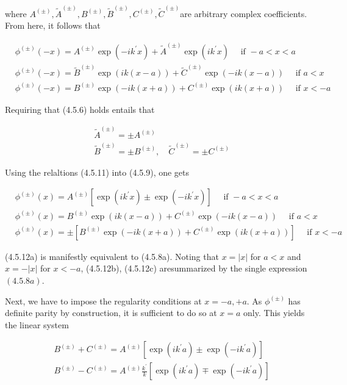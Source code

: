 \documentclass{article}
\begin{document}
where $A^{( \pm)}, \tilde{A}^{( \pm)}, B^{( \pm)}, \tilde{B}^{( \pm)}, C^{( \pm)}, \tilde{C}^{( \pm)}$are arbitrary complex coefficients. From here, it follows that
 
\begin{align*}
& \phi^{( \pm)}(-x)=A^{( \pm)} \exp \left(-i k^{\prime} x\right)+\tilde{A}^{( \pm)} \exp \left(i k^{\prime} x\right) \quad \text { if }-a<x<a  \tag{4.5.10a}\\
& \phi^{( \pm)}(-x)=\tilde{B}^{( \pm)} \exp (i k(x-a))+\tilde{C}^{( \pm)} \exp (-i k(x-a)) \quad \text { if } a<x  \tag{4.5.10b}\\
& \phi^{( \pm)}(-x)=B^{( \pm)} \exp (-i k(x+a))+C^{( \pm)} \exp (i k(x+a)) \quad \text { if } x<-a \tag{4.5.10c}
\end{align*}
 

Requiring that (4.5.6) holds entails that
 
\begin{align*}
& \tilde{A}^{( \pm)}= \pm A^{( \pm)}  \tag{4.5.11a}\\
& \tilde{B}^{( \pm)}= \pm B^{( \pm)}, \quad \tilde{C}^{( \pm)}= \pm C^{( \pm)} \tag{4.5.11b}
\end{align*}
 

Using the relaltions (4.5.11) into (4.5.9), one gets
 
\begin{align*}
& \phi^{( \pm)}(x)=A^{( \pm)}\left[\exp \left(i k^{\prime} x\right) \pm \exp \left(-i k^{\prime} x\right)\right] \quad \text { if }-a<x<a  \tag{4.5.12a}\\
& \phi^{( \pm)}(x)=B^{( \pm)} \exp (i k(x-a))+C^{( \pm)} \exp (-i k(x-a)) \quad \text { if } a<x  \tag{4.5.12b}\\
& \phi^{( \pm)}(x)= \pm\left[B^{( \pm)} \exp (-i k(x+a))+C^{( \pm)} \exp (i k(x+a))\right] \quad \text { if } x<-a \tag{4.5.12c}
\end{align*}
 
(4.5.12a) is manifestly equivalent to (4.5.8a). Noting that $x=|x|$ for $a<x$ and $x=-|x|$ for $x<-a$, (4.5.12b), (4.5.12c) aresummarized by the single expression $(4.5 .8 a)$.

Next, we have to impose the regularity conditions at $x=-a,+a$. As $\phi^{( \pm)}$ has definite parity by construction, it is sufficient to do so at $x=a$ only. This yields the linear system
 
\begin{align*}
& B^{( \pm)}+C^{( \pm)}=A^{( \pm)}\left[\exp \left(i k^{\prime} a\right) \pm \exp \left(-i k^{\prime} a\right)\right]  \tag{4.5.13a}\\
& B^{( \pm)}-C^{( \pm)}=A^{( \pm)} \frac{k^{\prime}}{k}\left[\exp \left(i k^{\prime} a\right) \mp \exp \left(-i k^{\prime} a\right)\right] \tag{4.5.13b}
\end{align*}
 
\end{document}
